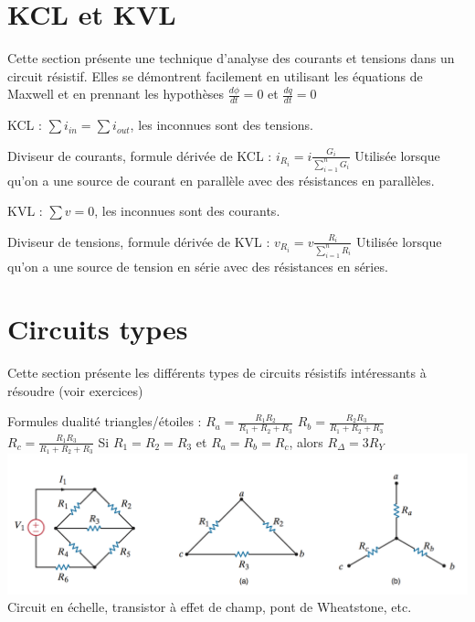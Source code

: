 \documentclass[11pt]{report}
\begin{document}
\section{KCL et KVL}
Cette section présente une technique d'analyse des courants et tensions dans un circuit résistif.
Elles se démontrent facilement en utilisant les équations de Maxwell et en prennant les hypothèses $\frac{d\phi}{dt} = 0$ et $\frac{dq}{dt} = 0$
\begin{framed}
   KCL : $\sum { { i }_{ in } } = \sum { { i }_{ out } }$, les inconnues sont des tensions. \newline

   Diviseur de courants, formule dérivée de KCL : ${ i }_{ { R }_{ i } }=i\frac { { G }_{ i } }{ \sum _{ i=1 }^{ n }{ { G }_{ i } }  } $\newline
  Utilisée lorsque qu'on a une source de courant en parallèle avec des résistances en parallèles.\newline

   KVL : $\sum { v } = 0$, les inconnues sont des courants. \newline

   Diviseur de tensions, formule dérivée de KVL : ${ v }_{ { R }_{ i } }=v\frac { { R }_{ i } }{ \sum _{ i=1 }^{ n }{ { R }_{ i } }  }$\newline
  Utilisée lorsque qu'on a une source de tension en série avec des résistances en séries.\newline
\end{framed}
\newpage
\section{Circuits types}
Cette section présente les différents types de circuits résistifs intéressants à résoudre (voir exercices)
\begin{framed}
   Formules dualité triangles/étoiles : \newline
  ${ R }_{ a }=\frac { { R }_{ 1 }{ R }_{ 2 } }{ { R }_{ 1 }+{ R }_{ 2 }+{ R }_{ 3 } }$ \newline
  $ { R }_{ b }=\frac { { R }_{ 2 }{ R }_{ 3 } }{ { R }_{ 1 }+{ R }_{ 2 }+{ R }_{ 3 } }$ \newline
  ${ R }_{ c }=\frac { { R }_{ 1 }{ R }_{ 3 } }{ { R }_{ 1 }+{ R }_{ 2 }+{ R }_{ 3 } }$ \newline
 Si $R_1=R_2=R_3$ et $R_a=R_b=R_c$, alors ${ R }_{ \Delta  }={ 3R }_{ Y }$\newline
 \includegraphics[width=14cm]{7.png}\newline
  Circuit en échelle, transistor à effet de champ, pont de Wheatstone, etc.
\end{framed}
\end{document}
